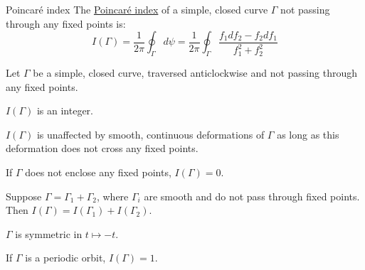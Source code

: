 \documentclass[../Main.tex]{subfiles}
\begin{document}
\begin{definition}{Poincaré index}
    The \underline{Poincaré index} of a simple, closed curve $\Gamma$ not passing through any fixed points is:
    \begin{equation*}
        I(\Gamma) = \frac{1}{2\pi} \oint_\Gamma d\psi = \frac1{2\pi} \oint_\Gamma \frac{f_1 df_2 - f_2 df_1}{f_1^2 + f_2^2}
    \end{equation*}
\end{definition}
\begin{propositions}{
        Let $\Gamma$ be a simple, closed curve, traversed anticlockwise and not passing through any fixed points.
        \label{propsPoincIndxProps}
    }
    \item $I(\Gamma)$ is an integer. \label{propPoincIndxInt}
    \item $I(\Gamma)$ is unaffected by smooth, continuous deformations of $\Gamma$ as long as this deformation does not cross any fixed points. \label{propPoincIndxDeform}
    \item If $\Gamma$ does not enclose any fixed points, $I(\Gamma) = 0$. \label{propPoincIndxZero}
    \item Suppose $\Gamma = \Gamma_1 + \Gamma_2$, where $\Gamma_i$ are smooth and do not pass through fixed points. Then $I(\Gamma) = I(\Gamma_1) + I(\Gamma_2)$. \label{propPoincIndxAdd}
    \item $\Gamma$ is symmetric in $t \mapsto -t$. \label{propPoincIndxTimeReverse}
    \item If $\Gamma$ is a periodic orbit, $I(\Gamma) = 1$. \label{propPoincIndxPeriodic}
\end{propositions}
\end{document}
